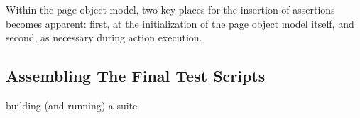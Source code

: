 Within the page object model, two key places for the insertion of assertions becomes apparent: first, at the initialization of the page object model itself, and second, as necessary during action execution.%

\subsection{Assembling The Final Test Scripts}
building (and running) a suite %
